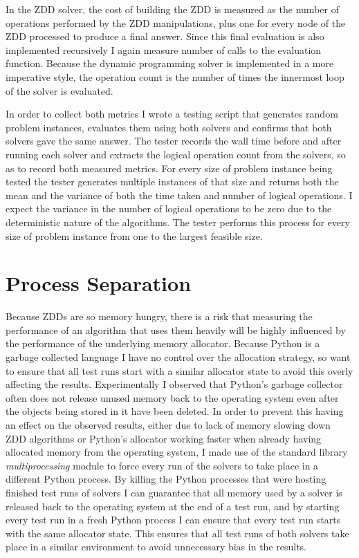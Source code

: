 \documentclass[12pt,a4paper,twoside,openright]{report}
\begin{document}
In the ZDD solver, the cost of building the ZDD is measured as the number of operations performed by the ZDD manipulations, plus one for every node of the ZDD processed to produce a final answer. Since this final evaluation is also implemented recursively I again measure number of calls to the evaluation function. Because the dynamic programming solver is implemented in a more imperative style, the operation count is the number of times the innermost loop of the solver is evaluated.

In order to collect both metrics I wrote a testing script that generates random problem instances, evaluates them using both solvers and confirms that both solvers gave the same answer. The tester records the wall time before and after running each solver and extracts the logical operation count from the solvers, so as to record both measured metrics. For every size of problem instance being tested the tester generates multiple instances of that size and returns both the mean and the variance of both the time taken and number of logical operations. I expect the variance in the number of logical operations to be zero due to the deterministic nature of the algorithms. The tester performs this process for every size of problem instance from one to the largest feasible size.

\section{Process Separation}
Because ZDDs are so memory hungry, there is a risk that measuring the performance of an algorithm that uses them heavily will be highly influenced by the performance of the underlying memory allocator. Because Python is a garbage collected language I have no control over the allocation strategy, so want to ensure that all test runs start with a similar allocator state to avoid this overly affecting the results. Experimentally I observed that Python's garbage collector often does not release unused memory back to the operating system even after the objects being stored in it have been deleted. In order to prevent this having an effect on the observed results, either due to lack of memory slowing down ZDD algorithms or Python's allocator working faster when already having allocated memory from the operating system, I made use of the standard library \textit{multiprocessing} module to force every run of the solvers to take place in a different Python process. By killing the Python processes that were hosting finished test runs of solvers I can guarantee that all memory used by a solver is released back to the operating system at the end of a test run, and by starting every test run in a fresh Python process I can ensure that every test run starts with the same allocator state. This ensures that all test runs of both solvers take place in a similar environment to avoid unnecessary bias in the results.
\end{document}
